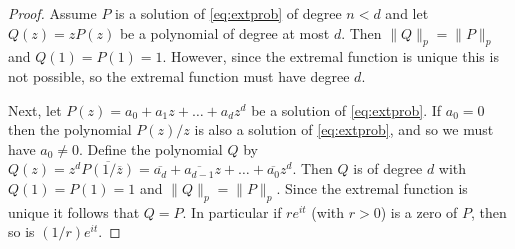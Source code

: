 \documentclass[10pt,a4paper]{amsart}
\begin{document}
	\begin{proof}
		Assume $P$ is a solution of \eqref{eq:extprob} of degree $n<d$ and let $Q(z)=zP(z)$ be a polynomial of degree at most $d$. Then $\|Q\|_p=\|P\|_p$ and $Q(1)=P(1)=1$. However, since the extremal function is unique this is not possible, so the extremal function must have degree $d$.
		
		Next, let $P(z)=a_0+a_1 z + \dots + a_d z^d$ be a solution of \eqref{eq:extprob}. If $a_0=0$ then the polynomial $P(z)/z$ is also a solution of \eqref{eq:extprob}, and so we must have $a_0 \neq 0$. Define the polynomial $Q$ by $Q(z)=z^d \overline{P(1/\overline{z})}=\overline{a_d}+ \overline{a_{d-1}}z + \dots + \overline{a_0}z^d$. Then $Q$ is of degree $d$ with $Q(1)=P(1)=1$ and $\|Q\|_p=\|P\|_p$. Since the extremal function is unique it follows that $Q=P$. In particular if $re^{i t}$ (with $r>0$) is a zero of $P$, then so is $(1/r) e^{i t}$. 
		

\end{proof}
\end{document}
